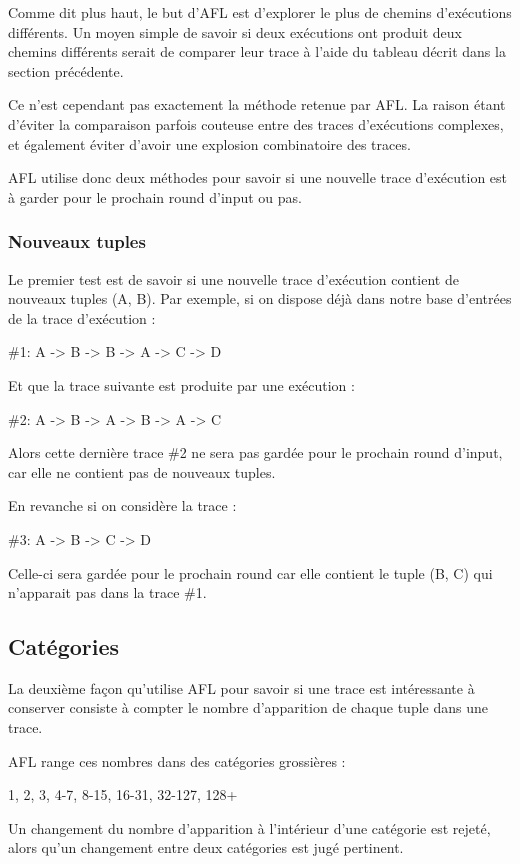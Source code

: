 Comme dit plus haut, le but d'AFL est d'explorer le plus de chemins
d'exécutions différents. Un moyen simple de savoir si deux exécutions
ont produit deux chemins différents serait de comparer leur trace à
l'aide du tableau décrit dans la section précédente.

Ce n'est cependant pas exactement la méthode retenue par AFL. La raison
étant d'éviter la comparaison parfois couteuse entre des traces
d'exécutions complexes, et également éviter d'avoir une explosion
combinatoire des traces.

AFL utilise donc deux méthodes pour savoir si une nouvelle trace d'exécution
est à garder pour le prochain round d'input ou pas.

\subsubsection{Nouveaux tuples}
Le premier test est de savoir si une nouvelle trace d'exécution contient de
nouveaux tuples (A, B). Par exemple, si on dispose déjà dans notre base
d'entrées de la trace d'exécution :

\#1: A -> B -> B -> A -> C -> D

Et que la trace suivante est produite par une exécution :

\#2: A -> B -> A -> B -> A -> C

Alors cette dernière trace \#2 ne sera pas gardée pour le prochain round
d'input, car elle ne contient pas de nouveaux tuples.

En revanche si on considère la trace :

\#3: A -> B -> C -> D

Celle-ci sera gardée pour le prochain round car elle contient le tuple
(B, C) qui n'apparait pas dans la trace \#1.

\subsection{Catégories}

La deuxième façon qu'utilise AFL pour savoir si une trace est
intéressante à conserver consiste à compter le nombre d'apparition de
chaque tuple dans une trace.

AFL range ces nombres dans des catégories grossières :

1, 2, 3, 4-7, 8-15, 16-31, 32-127, 128+

Un changement du nombre d'apparition à l'intérieur d'une catégorie
est rejeté, alors qu'un changement entre deux catégories est jugé
pertinent.

